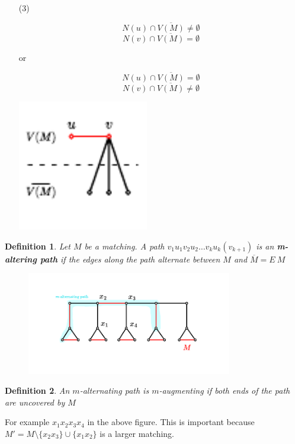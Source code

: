 \documentclass[notitlepage, 12pt]{article}
\newtheorem*{definition}{Definition}
\begin{document}
\begin{itemize}
\item[(3)]
\begin{minipage}{.20\textwidth}
  \[
    N(u) \cap \overline{V(M)} \neq \emptyset
  \]
  \[
    N(v) \cap \overline{V(M)} = \emptyset
  \]
\end{minipage}%
\begin{minipage}{.05\textwidth}
  or
  \centering
\end{minipage}%
\begin{minipage}{.20\textwidth}
  \[
    N(u) \cap \overline{V(M)} = \emptyset
  \]
  \[
    N(v) \cap \overline{V(M)} \neq \emptyset
  \]
\end{minipage}%
\begin{minipage}{.6\textwidth}
  \includegraphics[width=0.45\textwidth]{max-matching-structure-3.pdf}
  \centering
\end{minipage}
\end{itemize}
\begin{definition}
Let $M$ be a matching. A path $v_1u_1v_2u_2\dots v_k u_k (v_{k+1})$ is an \textbf{m-altering path} if the edges along
the path alternate between $M$ and $\overline{M} = E \ M$
\end{definition}
\begin{figure}[h]
  \includegraphics[width=0.8\textwidth]{m-alternating-example.pdf}
  \centering
\end{figure}
\begin{definition}
  An $m$-alternating path is $m$-augmenting if both ends of the path are uncovered by $M$
\end{definition}
For example $x_1x_2x_3x_4$ in the above figure.
This is important because $M'=M \setminus \{x_2x_3\}\cup \{x_1x_2\}$
is a larger matching.
\end{document}
